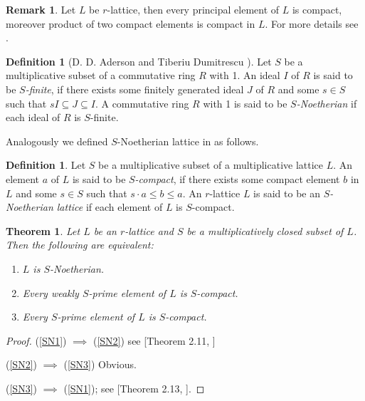 \documentclass[10pt,twoside,a4paper]{amsart}
\numberwithin{equation}{section}
\theoremstyle{plain}
\newtheorem{thm}[lem]{Theorem}
\theoremstyle{definition}
\newtheorem{rem}[lem]{Remark}
\newtheorem{defn}[lem]{Definition}
\begin{document}
\begin{rem}%
	Let $L$ be $r$-lattice, then every principal element of $L$ is compact, moreover product of two compact elements is compact in $L$. For more details see \cite{A}.
\end{rem}

\begin{defn} [D. D. Aderson and Tiberiu Dumitrescu \cite{AT}]
	Let $S$ be a multiplicative subset of a commutative ring $R$ with 1. An ideal $I$ of $R$ is said to be \textit{$S$-finite}, if there exists some finitely generated ideal $J$ of $R$ and some $s \in S$ such that $sI \subseteq J \subseteq I$. A commutative ring $R$ with 1 is said to be \textit{$S$-Noetherian} if each ideal of $R$ is $S$-finite.  
\end{defn}


Analogously we defined $S$-Noetherian lattice in \cite{SPJ2} as follows.

\begin{defn}\cite{SPJ2}
	Let $S$ be a multiplicative subset of a multiplicative lattice $L$. An element $a$ of $L$ is said to be \textit{$S$-compact}, if there exists some compact element $b$ in $L$ and some $s \in S$ such that $s\cdot a \leq b \leq a$. An $r$-lattice $L$ is said to be an \textit{$S$-Noetherian lattice} if each element of $L$ is $S$-compact.  
\end{defn}

	\begin{thm}%
		Let $L$ be an $r$-lattice and $S$ be a multiplicatively closed subset of $L$. Then the following are equivalent:
		\begin{enumerate}
			\item\label{SN1} $L$ is $S$-Noetherian.
			
			\item\label{SN2} Every weakly $S$-prime element of $L$ is $S$-compact.
			
			\item\label{SN3} Every $S$-prime element of $L$ is $S$-compact.
			
		\end{enumerate}
	\end{thm}
	\begin{proof}
		(\ref{SN1}) $\implies$ (\ref{SN2}) see [Theorem 2.11, \cite{SPJ2}]
		
		(\ref{SN2}) $\implies$ (\ref{SN3}) Obvious.
		
		(\ref{SN3}) $\implies$ (\ref{SN1});
		see [Theorem 2.13, \cite{SPJ2}].
	
	\end{proof}
	
\end{document}
